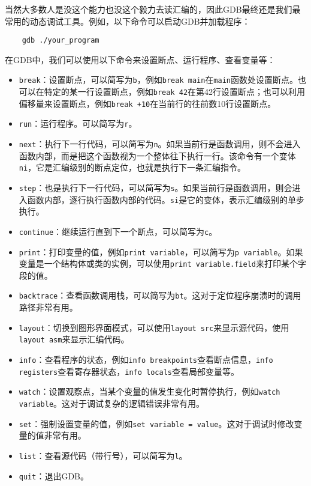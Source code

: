 \documentclass[../main.tex]{subfiles}
\begin{document}
当然大多数人是没这个能力也没这个毅力去读汇编的，因此GDB最终还是我们最常用的动态调试工具。例如，以下命令可以启动GDB并加载程序：
\begin{verbatim}
    gdb ./your_program
\end{verbatim}

在GDB中，我们可以使用以下命令来设置断点、运行程序、查看变量等：
\begin{itemize}
    \item \texttt{break}：设置断点，可以简写为\texttt{b}，例如\texttt{break main}在\texttt{main}函数处设置断点。也可以在特定的某一行设置断点，例如\texttt{break 42}在第42行设置断点；也可以利用偏移量来设置断点，例如\texttt{break +10}在当前行的往前数10行设置断点。
    \item \texttt{run}：运行程序。可以简写为\texttt{r}。
    \item \texttt{next}：执行下一行代码，可以简写为\texttt{n}。如果当前行是函数调用，则不会进入函数内部，而是把这个函数视为一个整体往下执行一行。该命令有一个变体\texttt{ni}，它是汇编级别的断点定位，也就是执行下一条汇编指令。
    \item \texttt{step}：也是执行下一行代码，可以简写为\texttt{s}。如果当前行是函数调用，则会进入函数内部，逐行执行函数内部的代码。\texttt{si}是它的变体，表示汇编级别的单步执行。
    \item \texttt{continue}：继续运行直到下一个断点，可以简写为\texttt{c}。
    \item \texttt{print}：打印变量的值，例如\texttt{print variable}，可以简写为\texttt{p variable}。如果变量是一个结构体或类的实例，可以使用\texttt{print variable.field}来打印某个字段的值。
    \item \texttt{backtrace}：查看函数调用栈，可以简写为\texttt{bt}。这对于定位程序崩溃时的调用路径非常有用。
    \item \texttt{layout}：切换到图形界面模式，可以使用\texttt{layout src}来显示源代码，使用\texttt{layout asm}来显示汇编代码。
    \item \texttt{info}：查看程序的状态，例如\texttt{info breakpoints}查看断点信息，\texttt{info registers}查看寄存器状态，\texttt{info locals}查看局部变量等。
    \item \texttt{watch}：设置观察点，当某个变量的值发生变化时暂停执行，例如\texttt{watch variable}。这对于调试复杂的逻辑错误非常有用。
    \item \texttt{set}：强制设置变量的值，例如\texttt{set variable = value}。这对于调试时修改变量的值非常有用。
    \item \texttt{list}：查看源代码（带行号），可以简写为\texttt{l}。
    \item \texttt{quit}：退出GDB。
\end{itemize}
\end{document}
